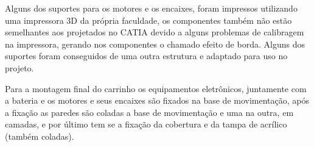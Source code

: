 Alguns dos suportes para os motores e os encaixes, foram impressos utilizando uma impressora 3D da própria faculdade, os componentes também
não estão semelhantes aos projetados no CATIA devido a alguns problemas de calibragem na impressora, gerando nos componentes o chamado efeito
de borda. Alguns dos suportes foram conseguidos de uma outra estrutura e adaptado para uso no projeto.

Para a montagem final do carrinho os equipamentos eletrônicos, juntamente com a bateria e os motores e seus encaixes são fixados na base de
movimentação, após a fixação as paredes são coladas a base de movimentação e uma na outra, em camadas, e por último tem se a fixação da cobertura
e da tampa de acrílico (também coladas).

